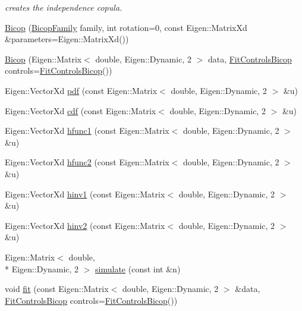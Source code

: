 \begin{DoxyCompactItemize}
\begin{DoxyCompactList}\small\item\em creates the independence copula. \end{DoxyCompactList}\item 
\hyperlink{classvinecopulib_1_1_bicop_ab27f789e001e30f2fed7f9ecefdeffb0}{Bicop} (\hyperlink{namespacevinecopulib_a42e95cc06d33896199caab0c11ad44f3}{Bicop\+Family} family, int rotation=0, const Eigen\+::\+Matrix\+Xd \&parameters=Eigen\+::\+Matrix\+Xd())
\item 
\hyperlink{classvinecopulib_1_1_bicop_afc8b465d9e02a3df1c25f7c1e7ac9240}{Bicop} (Eigen\+::\+Matrix$<$ double, Eigen\+::\+Dynamic, 2 $>$ data, \hyperlink{classvinecopulib_1_1_fit_controls_bicop}{Fit\+Controls\+Bicop} controls=\hyperlink{classvinecopulib_1_1_fit_controls_bicop}{Fit\+Controls\+Bicop}())
\item 
Eigen\+::\+Vector\+Xd \hyperlink{classvinecopulib_1_1_bicop_a83dc7214e4bb1bfe59285ca05407d646}{pdf} (const Eigen\+::\+Matrix$<$ double, Eigen\+::\+Dynamic, 2 $>$ \&u)
\item 
Eigen\+::\+Vector\+Xd \hyperlink{classvinecopulib_1_1_bicop_a153d7e766388066eda14577c5a6332cc}{cdf} (const Eigen\+::\+Matrix$<$ double, Eigen\+::\+Dynamic, 2 $>$ \&u)
\item 
Eigen\+::\+Vector\+Xd \hyperlink{classvinecopulib_1_1_bicop_a130fda62cd61c7acdef5db75fffdd89e}{hfunc1} (const Eigen\+::\+Matrix$<$ double, Eigen\+::\+Dynamic, 2 $>$ \&u)
\item 
Eigen\+::\+Vector\+Xd \hyperlink{classvinecopulib_1_1_bicop_a4c9b50f99797ec374f5057cc54db2bd8}{hfunc2} (const Eigen\+::\+Matrix$<$ double, Eigen\+::\+Dynamic, 2 $>$ \&u)
\item 
Eigen\+::\+Vector\+Xd \hyperlink{classvinecopulib_1_1_bicop_a3cc8b161ec6efdb3b34d2efa9185bf44}{hinv1} (const Eigen\+::\+Matrix$<$ double, Eigen\+::\+Dynamic, 2 $>$ \&u)
\item 
Eigen\+::\+Vector\+Xd \hyperlink{classvinecopulib_1_1_bicop_a3e33ec227b6b7182e327399201cad382}{hinv2} (const Eigen\+::\+Matrix$<$ double, Eigen\+::\+Dynamic, 2 $>$ \&u)
\item 
Eigen\+::\+Matrix$<$ double, \\*
Eigen\+::\+Dynamic, 2 $>$ \hyperlink{classvinecopulib_1_1_bicop_aeb87bea4283dacfa5e609356c020f85d}{simulate} (const int \&n)
\item 
void \hyperlink{classvinecopulib_1_1_bicop_a2d509a8b404a73ef17f04a0678e90a71}{fit} (const Eigen\+::\+Matrix$<$ double, Eigen\+::\+Dynamic, 2 $>$ \&data, \hyperlink{classvinecopulib_1_1_fit_controls_bicop}{Fit\+Controls\+Bicop} controls=\hyperlink{classvinecopulib_1_1_fit_controls_bicop}{Fit\+Controls\+Bicop}())

\end{DoxyCompactItemize}
